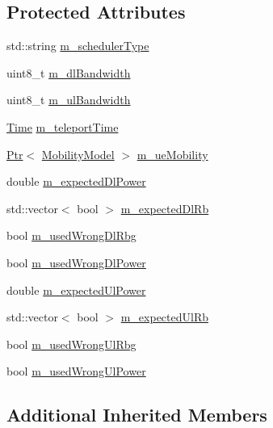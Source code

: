 \subsection*{Protected Attributes}
\begin{DoxyCompactItemize}
\item 
std\+::string \hyperlink{classLteFrAreaTestCase_aa093fda7c4b63732d547c87952f52f05}{m\+\_\+scheduler\+Type}
\item 
uint8\+\_\+t \hyperlink{classLteFrAreaTestCase_a645fc2cea287afbd373f6d702152cf47}{m\+\_\+dl\+Bandwidth}
\item 
uint8\+\_\+t \hyperlink{classLteFrAreaTestCase_afa54487d9f12658bbead39e1272f4d8c}{m\+\_\+ul\+Bandwidth}
\item 
\hyperlink{classns3_1_1Time}{Time} \hyperlink{classLteFrAreaTestCase_a055d27717dd59f245a2ce57adcb8f201}{m\+\_\+teleport\+Time}
\item 
\hyperlink{classns3_1_1Ptr}{Ptr}$<$ \hyperlink{classns3_1_1MobilityModel}{Mobility\+Model} $>$ \hyperlink{classLteFrAreaTestCase_ae2f235fc4d87154ef9f32bc0d92ef2ca}{m\+\_\+ue\+Mobility}
\item 
double \hyperlink{classLteFrAreaTestCase_ac5fb6a1bba84f19ef3e4293f504e8084}{m\+\_\+expected\+Dl\+Power}
\item 
std\+::vector$<$ bool $>$ \hyperlink{classLteFrAreaTestCase_a19ab4c52ca163909888b18b2acb25ca8}{m\+\_\+expected\+Dl\+Rb}
\item 
bool \hyperlink{classLteFrAreaTestCase_acf1b825c0fc50c57ac990d11ea1529c0}{m\+\_\+used\+Wrong\+Dl\+Rbg}
\item 
bool \hyperlink{classLteFrAreaTestCase_af28dcf9d2e3d603ef07c35df8ed062dc}{m\+\_\+used\+Wrong\+Dl\+Power}
\item 
double \hyperlink{classLteFrAreaTestCase_a922e1db8b3366acf7163fd1a9f3108c5}{m\+\_\+expected\+Ul\+Power}
\item 
std\+::vector$<$ bool $>$ \hyperlink{classLteFrAreaTestCase_a60f609bb178ee3565a502f7e8fb34300}{m\+\_\+expected\+Ul\+Rb}
\item 
bool \hyperlink{classLteFrAreaTestCase_a11e401119f17b78d6693ef29f82b8895}{m\+\_\+used\+Wrong\+Ul\+Rbg}
\item 
bool \hyperlink{classLteFrAreaTestCase_ab040f873eb53ee13d4f6a2a810545d17}{m\+\_\+used\+Wrong\+Ul\+Power}
\end{DoxyCompactItemize}
\subsection*{Additional Inherited Members}


